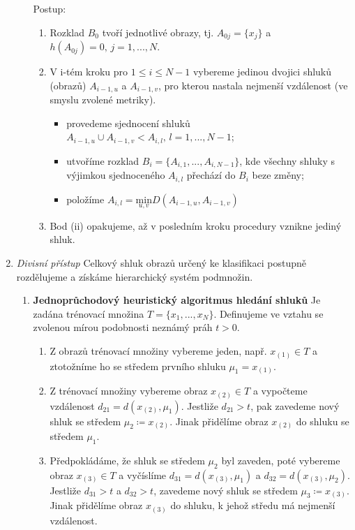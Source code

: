 \begin{enumerate}[label=(\Alph*)]
\begin{enumerate}[label=\arabic*.]
Postup:
\begin{enumerate}[label=(\roman*)]
\item Rozklad $ B_0 $ tvoří jednotlivé obrazy, tj. $ A_{0j} = \{x_j\} $ a $ h(A_{0j}) = 0, \, j=1,...,N $.
\item V i-tém kroku pro $ 1 \leq i \leq N-1 $ vybereme jedinou dvojici shluků (obrazů) $ A_{i-1, u} $ a $ A_{i-1, v} $, pro kterou nastala nejmenší vzdálenost (ve smyslu zvolené metriky).
\begin{itemize}
\item provedeme sjednocení shluků $ A_{i-1, u} \cup A_{i-1, v} < A_{i, l}, \, l=1,...,N-1 $;
\item utvoříme rozklad $ B_i = \{A_{i,1},...,A_{i,N-1}\} $, kde všechny shluky s výjimkou sjednoceného $ A_{i,l} $ přechází do $ B_i $ beze změny;
\item položíme $ A_{i,l} = \underset{u,v}{\mathrm{min}} D(A_{i-1, u}, A_{i-1, v}) $
\end{itemize}
\item Bod (ii) opakujeme, až v posledním kroku procedury vznikne jediný shluk.
\end{enumerate}
\end{enumerate}
\item \textit{Divisní přístup}
Celkový shluk obrazů určený ke klasifikaci postupně rozdělujeme a získáme hierarchický systém podmnožin.
\begin{enumerate}[label=\arabic*.]
\item \textbf{Jednoprůchodový heuristický algoritmus hledání shluků}
Je zadána trénovací množina $ T = \{x_1, ..., x_N\} $. Definujeme ve vztahu se zvolenou mírou podobnosti neznámý práh $ t > 0 $.
\begin{enumerate}[label=(\roman*)]
\item Z obrazů trénovací množiny vybereme jeden, např. $ x_{(1)} \in T $ a ztotožníme ho se středem prvního shluku $ \mu_1 = x_{(1)} $.
\item Z trénovací množiny vybereme obraz $ x_{(2)} \in T $ a vypočteme vzdálenost $ d_{21} = d(x_{(2)}, \mu_1) $. Jestliže $ d_{21} > t $, pak zavedeme nový shluk se středem $ \mu_2 \coloneqq x_{(2)} $. Jinak přidělíme obraz $ x_{(2)} $ do shluku se středem $ \mu_1 $.
\item Předpokládáme, že shluk se středem $ \mu_2 $ byl zaveden, poté vybereme obraz $ x_{(3)} \in T $ a vyčíslíme $ d_{31} = d(x_{(3)}, \mu_1) $ a $ d_{32} = d(x_{(3)}, \mu_2) $. Jestliže $ d_{31} > t $ a $ d_{32} > t $, zavedeme nový shluk se středem $ \mu_3 \coloneqq x_{(3)} $. Jinak přidělíme obraz $ x_{(3)} $ do shluku, k jehož středu má nejmenší vzdálenost.

\end{enumerate}
\end{enumerate}
\end{enumerate}
